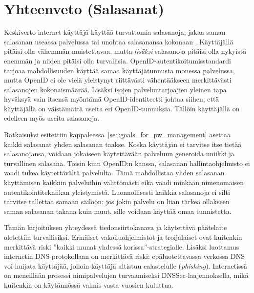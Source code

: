 \documentclass[english,gradu]{tktltiki}
\begin{document}

\section{Yhteenveto (Salasanat)} %
\label{sec:yhteenveto_salasanat_}

Keskiverto internet-käyttäjä käyttää turvattomia salasanoja, jakaa saman salasanan useassa palvelussa tai unohtaa salasanansa kokonaan \cite{study_of_passwords_07, password_management_strategies_06, generating_and_remembering_pws_04, users_are_not_the_enemy_99}. Käyttäjällä pitäisi olla vähemmän muistettavaa, mutta \emph{lisäksi} salasanoja pitäisi olla nykyistä enemmän ja niiden pitäisi olla turvallisia.
OpenID-autentikoitumisstandardi tarjoaa mahdollisuuden käyttää samaa käyttäjätunnusta monessa palvelussa, mutta OpenID ei ole vielä yleistynyt riittävästi vähentääkseen merkittävästi salasanojen kokonaismäärää. Lisäksi isojen palveluntarjoajien yleinen tapa hyväksyä vain itsensä myöntämä OpenID-identiteetti johtaa siihen, että käyttäjällä on väistämättä useita eri OpenID-tunnuksia. Tällöin käyttäjällä on edelleen myös useita salasanoja.

Ratkaisuksi esitettiin kappaleessa~\ref{sec:goals_for_pw_management} asettaa kaikki salasanat yhden salasanan taakse. Koska käyttäjän ei tarvitse itse tietää salasanojansa, voidaan jokaiseen käytettävään palveluun generoida uniikki ja turvallinen salasana. Toisin kuin OpenID:n kanssa, salasanan hallintaohjelmisto ei vaadi tukea käytettävältä palvelulta. Tämä mahdollistaa yhden salasanan käyttämisen kaikkiin palveluihin välittömästi eikä vaadi minkään nimenomaisen autentikointitekniikan yleistymistä. Luonnollisesti kaikkia salasanoja ei silti tarvitse tallettaa samaan säilöön: jos jokin palvelu on liian tärkeä ollakseen saman salasanan takana kuin muut, sille voidaan käyttää omaa tunnistetta.

Tämän kirjoituksen yhteydessä tiedonsiirtokanava ja käytettävä päätelaite oletettiin turvallisiksi. Erinäiset vakoiluohjelmistot ja troijalaiset ovat kuitenkin merkittävä riski ''kaikki munat yhdessä korissa''-strategialle. Lisäksi luottamus internetin DNS-protokollaan on merkittävä riski: epäluotettavassa verkossa DNS voi huijata käyttäjää, jolloin käyttäjä altistuu calastelulle (\emph{phishing}).
Internetissä on meneillään prosessi nimipalvelujen turvaamiseksi DNSSec-laajennoksella, mikä kuitenkin on käytännössä valmis vasta vuosien kuluttua.
\end{document}
